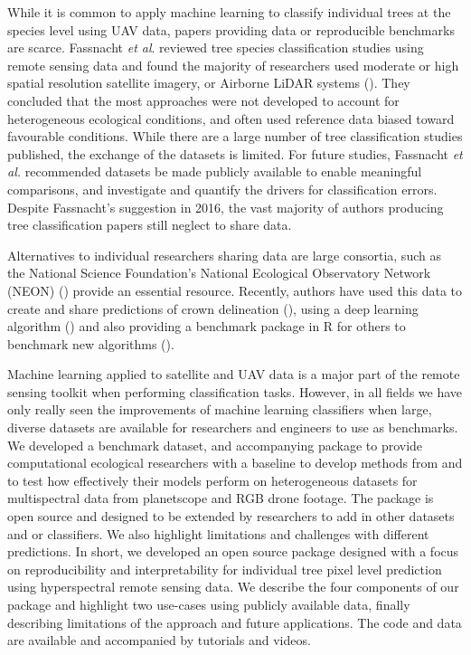 \documentclass[9pt,lineno]{elife}
\begin{document}
While it is common to apply machine learning to classify individual trees at the species level using UAV data, papers providing data or reproducible benchmarks are scarce. Fassnacht \textit{et al}. reviewed tree species classification studies using remote sensing data and found the majority of researchers used moderate or high spatial resolution satellite imagery, or Airborne LiDAR systems (\cite{Fassnacht_2016}). They concluded that the most approaches were not developed to account for heterogeneous ecological conditions, and often used reference data biased toward favourable conditions. While there are a large number of tree classification studies published, the exchange of the datasets is limited. For future studies, Fassnacht \textit{et al.} recommended datasets be made publicly available to enable meaningful comparisons, and investigate and quantify the drivers for classification errors. Despite Fassnacht's suggestion in 2016, the vast majority of authors producing tree classification papers still neglect to share data.

Alternatives to individual researchers sharing data are large consortia, such as the National Science Foundation's National Ecological Observatory Network (NEON) (\cite{NEON}) provide an essential resource. Recently, authors have used this data to create and share predictions of crown delineation (\cite{Weinstein_Marconi_Zare_Bohlman_Graves_Singh_White_2020, Weinstein_Marconi_Bohlman_Zare_Singh_Graves_White_2021}), using a deep learning algorithm (\cite{Weinstein_White_2020}) and also providing a benchmark package in R for others to benchmark new algorithms (\cite{Weinstein_Graves_Marconi_Singh_Zare_Stewart_Bohlman_White_2021}).


Machine learning applied to satellite and UAV data is a major part of the remote sensing toolkit when performing classification tasks. However, in all fields we have only really seen the improvements of machine learning classifiers when large, diverse datasets are available for researchers and engineers to use as benchmarks. We developed a benchmark dataset, and accompanying package to provide computational ecological researchers with a baseline to develop methods from and to test how effectively their models perform on heterogeneous datasets for multispectral data from planetscope and RGB drone footage. The package is open source and designed to be extended by researchers to add in other datasets and or classifiers. We also highlight limitations and challenges with different predictions. In short, we developed an open source package designed with a focus on reproducibility and interpretability for individual tree pixel level prediction using hyperspectral remote sensing data. We describe the four components of our package and highlight two use-cases using publicly available data, finally describing limitations of the approach and future applications. The code and data are available and accompanied by tutorials and videos.
\end{document}

